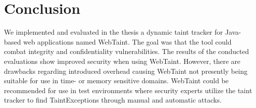 \chapter{Conclusion}
\label{Conclusion}
We implemented and evaluated in the thesis a dynamic taint tracker for Java-based web applications named WebTaint. The goal was that the tool could combat integrity and confidentiality vulnerabilities. The results of the conducted evaluations show improved security when using WebTaint. However, there are drawbacks regarding introduced overhead causing WebTaint not presently being suitable for use in time- or memory sensitive domains. WebTaint could be recommended for use in test environments where security experts utilize the taint tracker to find TaintExceptions through manual and automatic attacks.
